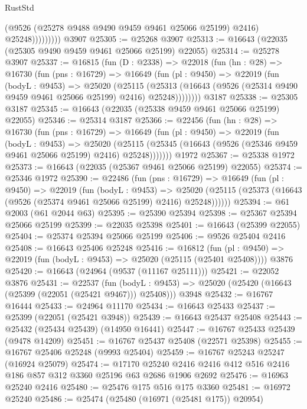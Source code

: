 \begin{lexlean}{RustStd}
\begin{coremodule}
                      (@9526 (@25278 @9488 @9490 @9459 @9461 @25066 @25199) @2416)
                      @25248)))))))))
    @3907
@25305 := @25268 @3907
@25313 := @16643 (@22035 (@25305 @9490 @9459 @9461 @25066 @25199) @22055)
@25314 := @25278 @3907
@25337 := @16815
    (fun (D : @2338) =>
    @22018
      (fun (hn : @28) =>
      @16730
        (fun (pns : @16729) =>
        @16649
          (fun (pl : @9450) =>
          @22019
            (fun (bodyL : @9453) =>
            @25020
              (@25115
                (@25313
                  (@16643 (@9526 (@25314 @9490 @9459 @9461 @25066 @25199) @2416) @25248))))))))
    @3187
@25338 := @25305 @3187
@25345 := @16643 (@22035 (@25338 @9459 @9461 @25066 @25199) @22055)
@25346 := @25314 @3187
@25366 := @22456
    (fun (hn : @28) =>
    @16730
      (fun (pns : @16729) =>
      @16649
        (fun (pl : @9450) =>
        @22019
          (fun (bodyL : @9453) =>
          @25020
            (@25115 (@25345 (@16643 (@9526 (@25346 @9459 @9461 @25066 @25199) @2416) @25248)))))))
    @1972
@25367 := @25338 @1972
@25373 := @16643 (@22035 (@25367 @9461 @25066 @25199) @22055)
@25374 := @25346 @1972
@25390 := @22486
    (fun (pns : @16729) =>
    @16649
      (fun (pl : @9450) =>
      @22019
        (fun (bodyL : @9453) =>
        @25020 (@25115 (@25373 (@16643 (@9526 (@25374 @9461 @25066 @25199) @2416) @25248))))))
@25394 := @61 @2003 (@61 @2044 @63)
@25395 := @25390 @25394
@25398 := @25367 @25394 @25066 @25199
@25399 := @22035 @25398
@25401 := @16643 (@25399 @22055)
@25404 := @25374 @25394 @25066 @25199
@25406 := @9526 @25404 @2416
@25408 := @16643 @25406 @25248
@25416 := @16812
    (fun (pl : @9450) => @22019 (fun (bodyL : @9453) => @25020 (@25115 (@25401 @25408))))
    @3876
@25420 := @16643 (@24964 (@9537 (@11167 @25111)))
@25421 := @22052 @3876
@25431 := @22537
    (fun (bodyL : @9453) => @25020 (@25420 (@16643 (@25399 (@22051 (@25421 @9467))) @25408)))
    @3948
@25432 := @16767 @16444
@25433 := @24964 @11170
@25434 := @16643 @25433
@25437 := @25399 (@22051 (@25421 @3948))
@25439 := @16643 @25437 @25408
@25443 := @25432 (@25434 @25439) (@14950 @16441)
@25447 := @16767 @25433 @25439 (@9478 @14209)
@25451 := @16767 @25437 @25408 (@22571 @25398)
@25455 := @16767 @25406 @25248 (@9993 @25404)
@25459 := @16767 @25243 @25247 (@16924 @25079)
@25474 := @17170
    @25240
    @2416
    @2416
    @412
    @516
    @2416
    @186
    @857
    @312
    @3360
    @25196
    @63
    @2686
    @1906
    @2692
@25476 := @16963 @25240 @2416
@25480 := @25476 @175 @516 @175 @3360
@25481 := @16972 @25240
@25486 := @25474 (@25480 (@16971 (@25481 @175)) @20954)

\end{coremodule}
\end{lexlean}
